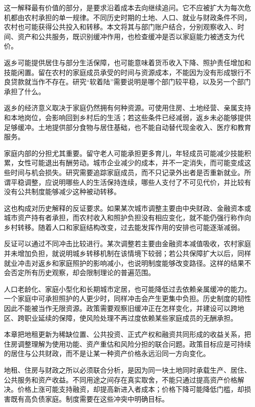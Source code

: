 \documentclass[UTF8,fontset=fandol,zihao=-4,oneside,openany]{ctexbook}
\begin{document}
这一解释最有价值的部分，是要求沿着成本去向继续追问。它不应被扩大为每次危机都由农村承担的单一规律。不同历史时期的土地、人口、就业与财政条件不同，农村也可能获得公共投入和转移。本文将其与部门账户结合，分别观察收入、时间、资产和公共服务，既识别缓冲作用，也检查缓冲是否以家庭能力被透支为代价。

返乡可能提供居住与部分生活保障，也可能意味着货币收入下降、照护责任增加和技能闲置。留在农村的家庭成员承受的时间与资源成本，不能因为没有形成银行不良贷款就当作不存在。研究“软着陆”需要说明是哪个部门较平稳，以及另一个部门承担了什么。

\label{arg:P134}
返乡的经济意义取决于家庭仍然拥有何种资源。可使用住房、土地经营、亲属支持和本地岗位，会影响回到乡村后的生活；若这些条件已经减弱，返乡未必能够提供足够缓冲。土地提供部分食物与居住基础，也不能自动替代现金收入、医疗和教育服务。

家庭内部的分担尤其重要。留守老人可能承担更多育儿，年轻成员可能减少技能积累，女性可能退出有酬劳动。城市企业减少的成本，并不一定消失，而可能变成这些时间与机会损失。研究需要追踪家庭成员，而不只记录外出者是否重新就业。所谓平稳调整，应说明哪些人的生活保持连续，哪些人支付了不可见代价，并比较有没有公共制度能够减少这种被动转移。

这也构成对历史解释的反证要求。如果某次城市调整主要由中央财政、金融资本或城市资产持有者承担，而农村收入和照护负担没有相应变化，就不能仍强行称作向乡村转移。随着人口和家庭结构改变，过去能发挥作用的安排也可能逐渐减弱。

\label{arg:P135}
反证可以通过不同冲击比较进行。某次调整若主要由金融资本减值吸收，农村家庭并未增加负担，就说明城乡转移机制在该情境下较弱；若公共保障扩大以后，同样就业冲击对返乡和家庭照护的影响减小，也说明制度能够改变路径。这样的结果不会否定所有历史观察，却会限制理论的普遍范围。

人口老龄化、家庭小型化和长期城市定居，也可能降低过去依赖亲属缓冲的能力。一个家庭中可承担照护的人更少时，同样冲击会产生更集中负担。历史制度的韧性因此不能被当作无限资源。政策需要观察旧缓冲正在怎样变化，并建设可以跨地区、跨职业延续的保障，使风险处理不再过度依赖某些家庭成员的无酬承担。

本章把地租更新为稀缺位置、公共投资、正式产权和融资共同形成的收益关系，把住房调整理解为使用功能、资产重估和风险分担的联合问题。政策目标应是可持续的居住与公共财政，而不是让某一种资产价格永远沿同一方向变化。

\label{arg:P136}
地租、住房与财政之所以必须联合分析，是因为同一块土地同时承载生产、居住、公共服务和资产收益。不同用途之间存在真实取舍，不能只通过提高资产价格解决。价格上涨可能支持融资，却提高新进入者成本；价格下降可能降低门槛，却损害既有高负债家庭。制度需要在这些冲突中明确目标。
\end{document}
